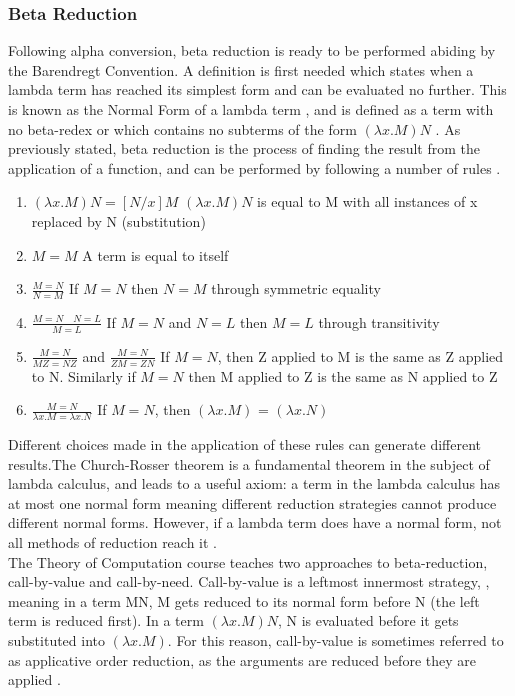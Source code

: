 \documentclass[a4paper,11pt]{report}
\begin{document}
\subsubsection{Beta Reduction}

Following alpha conversion, beta reduction is ready to be performed abiding by the Barendregt Convention. A definition is first needed which states when a lambda term has reached its simplest form and can be evaluated no further. This is known as the Normal Form of a lambda term \cite{Barendregt2000}, and is defined as a term with no beta-redex \cite{Hudak2008} or which contains no subterms of the form $(\lambda x.M)N$ \cite{Hankin2004}. As previously stated, beta reduction is the process of finding the result from the application of a function, and can be performed by following a number of rules \cite{Gay2019}.

\begin{enumerate}
	\item $(\lambda x.M)N = [N / x]M$
	\subitem $(\lambda x.M)N$ is equal to M with all instances of x replaced by N (substitution)
	\item $M = M$
	\subitem A term is equal to itself
	\item $\frac{M=N}{N=M}$
	\subitem If $M=N$ then $N=M$ through symmetric equality
	\item $\frac{M=N \quad N=L}{M=L}$
	\subitem If $M=N$ and $N=L$ then $M=L$ through transitivity
	\item $\frac{M=N}{MZ=NZ}$ and $\frac{M=N}{ZM=ZN}$
	\subitem If $M=N$, then Z applied to M is the same as Z applied to N. Similarly if $M=N$ then M applied to Z is the same as N applied to Z
	\item $\frac{M=N}{\lambda x.M = \lambda x.N}$
	\subitem If $M=N$, then $(\lambda x.M)$ = $(\lambda x.N)$
\end{enumerate}

Different choices made in the application of these rules can generate different results.The Church-Rosser theorem is a fundamental theorem in the subject of lambda calculus, and leads to a useful axiom: a term in the lambda calculus has at most one normal form \cite{Alonzo1936} meaning different reduction strategies cannot produce different normal forms. However, if a lambda term does have a normal form, not all methods of reduction reach it \cite{Horowitz2013}.\\

The Theory of Computation course teaches two approaches to beta-reduction, call-by-value and call-by-need. Call-by-value is a leftmost innermost strategy, \cite{Gay2019}, meaning in a term MN, M gets reduced to its normal form before N (the left term is reduced first). In a term $(\lambda x.M)N$, N is evaluated before it gets substituted into $(\lambda x.M)$. For this reason, call-by-value is sometimes referred to as applicative order reduction, as the arguments are reduced before they are applied \cite{Sookocheff2018Evaluation}.\\
\end{document}
